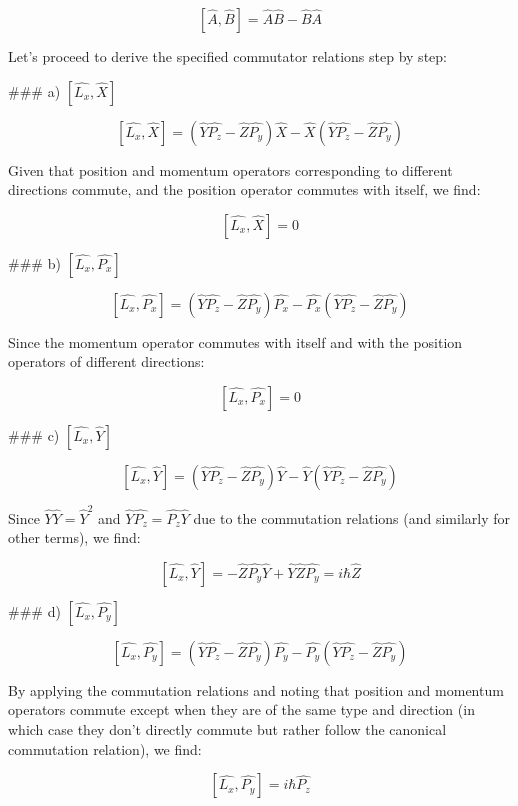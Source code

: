 \documentclass[a4paper,11pt]{article}
\begin{document}
\[
[\hat{A}, \hat{B}] = \hat{A}\hat{B} - \hat{B}\hat{A}
\]

Let's proceed to derive the specified commutator relations step by step:

### a) \( \left[ \hat{L_{x}}, \hat{X} \right] \)

\[
\left[ \hat{L_{x}}, \hat{X} \right] = (\hat{Y}\hat{P_{z}} - \hat{Z}\hat{P_{y}})\hat{X} - \hat{X}(\hat{Y}\hat{P_{z}} - \hat{Z}\hat{P_{y}})
\]

Given that position and momentum operators corresponding to different directions commute, and the position operator commutes with itself, we find:

\[
\left[ \hat{L_{x}}, \hat{X} \right] = 0
\]

### b) \( \left[ \hat{L_{x}}, \hat{P_{x}} \right] \)

\[
\left[ \hat{L_{x}}, \hat{P_{x}} \right] = (\hat{Y}\hat{P_{z}} - \hat{Z}\hat{P_{y}})\hat{P_{x}} - \hat{P_{x}}(\hat{Y}\hat{P_{z}} - \hat{Z}\hat{P_{y}})
\]

Since the momentum operator commutes with itself and with the position operators of different directions:

\[
\left[ \hat{L_{x}}, \hat{P_{x}} \right] = 0
\]

### c) \( \left[ \hat{L_{x}}, \hat{Y} \right] \)

\[
\left[ \hat{L_{x}}, \hat{Y} \right] = (\hat{Y}\hat{P_{z}} - \hat{Z}\hat{P_{y}})\hat{Y} - \hat{Y}(\hat{Y}\hat{P_{z}} - \hat{Z}\hat{P_{y}})
\]

Since \( \hat{Y} \hat{Y} = \hat{Y}^2 \) and \( \hat{Y} \hat{P_{z}} = \hat{P_{z}} \hat{Y} \) due to the commutation relations (and similarly for other terms), we find:

\[
\left[ \hat{L_{x}}, \hat{Y} \right] = -\hat{Z}\hat{P_{y}}\hat{Y} + \hat{Y}\hat{Z}\hat{P_{y}} = i\hbar\hat{Z}
\]

### d) \( \left[ \hat{L_{x}}, \hat{P_{y}} \right] \)

\[
\left[ \hat{L_{x}}, \hat{P_{y}} \right] = (\hat{Y}\hat{P_{z}} - \hat{Z}\hat{P_{y}})\hat{P_{y}} - \hat{P_{y}}(\hat{Y}\hat{P_{z}} - \hat{Z}\hat{P_{y}})
\]

By applying the commutation relations and noting that position and momentum operators commute except when they are of the same type and direction (in which case they don't directly commute but rather follow the canonical commutation relation), we find:

\[
\left[ \hat{L_{x}}, \hat{P_{y}} \right] = i\hbar\hat{P_{z}}
\]
\end{document}
